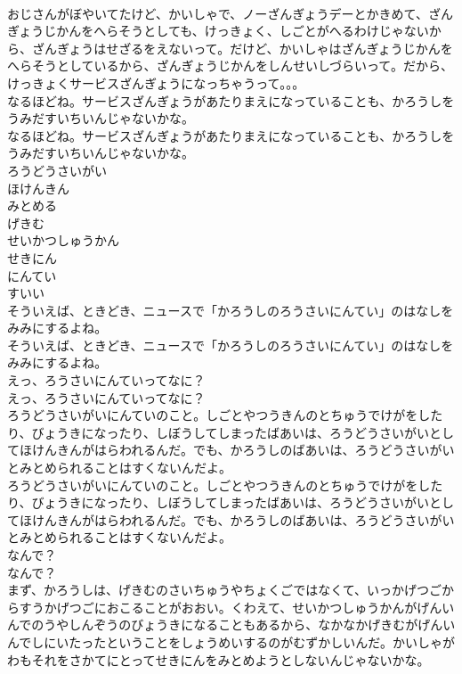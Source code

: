 \documentclass[8pt]{extreport}
\begin{document}
\begin{CJK}{UTF8}{min}
\\	おじさんがぼやいてたけど、かいしゃで、ノーざんぎょうデーとかきめて、ざんぎょうじかんをへらそうとしても、けっきょく、しごとがへるわけじゃないから、ざんぎょうはせざるをえないって。だけど、かいしゃはざんぎょうじかんをへらそうとしているから、ざんぎょうじかんをしんせいしづらいって。だから、けっきょくサービスざんぎょうになっちゃうって。。。
\\	なるほどね。サービスざんぎょうがあたりまえになっていることも、かろうしをうみだすいちいんじゃないかな。
\\	なるほどね。サービスざんぎょうがあたりまえになっていることも、かろうしをうみだすいちいんじゃないかな。
\\	ろうどうさいがい
\\	ほけんきん
\\	みとめる
\\	げきむ
\\	せいかつしゅうかん
\\	せきにん
\\	にんてい
\\	すいい
\\	そういえば、ときどき、ニュースで「かろうしのろうさいにんてい」のはなしをみみにするよね。
\\	そういえば、ときどき、ニュースで「かろうしのろうさいにんてい」のはなしをみみにするよね。
\\	えっ、ろうさいにんていってなに？
\\	えっ、ろうさいにんていってなに？
\\	ろうどうさいがいにんていのこと。しごとやつうきんのとちゅうでけがをしたり、びょうきになったり、しぼうしてしまったばあいは、ろうどうさいがいとしてほけんきんがはらわれるんだ。でも、かろうしのばあいは、ろうどうさいがいとみとめられることはすくないんだよ。
\\	ろうどうさいがいにんていのこと。しごとやつうきんのとちゅうでけがをしたり、びょうきになったり、しぼうしてしまったばあいは、ろうどうさいがいとしてほけんきんがはらわれるんだ。でも、かろうしのばあいは、ろうどうさいがいとみとめられることはすくないんだよ。
\\	なんで？
\\	なんで？
\\	まず、かろうしは、げきむのさいちゅうやちょくごではなくて、いっかげつごからすうかげつごにおこることがおおい。くわえて、せいかつしゅうかんがげんいんでのうやしんぞうのびょうきになることもあるから、なかなかげきむがげんいんでしにいたったということをしょうめいするのがむずかしいんだ。かいしゃがわもそれをさかてにとってせきにんをみとめようとしないんじゃないかな。

\end{CJK}
\end{document}
